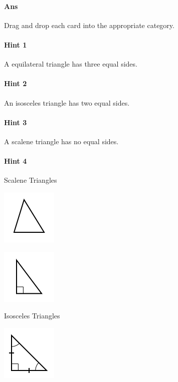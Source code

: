 \documentclass[twocolumn,10pt]{article}
\def\shrinkfactor{0.55}
\begin{document}
\paragraph{Ans} Drag and drop each card into the appropriate category. 

\paragraph{Hint 1}A equilateral triangle has three equal sides.



\paragraph{Hint 2}An isosceles triangle has two equal sides.

\paragraph{Hint 3}A scalene triangle has no equal sides.

\paragraph{Hint 4}Scalene Triangles


\includegraphics[scale=\shrinkfactor]{figures/ee7f87a00acb47dec4f2b2eed9a6741b21afc47d.png}


\includegraphics[scale=\shrinkfactor]{figures/3b6a413f170d28d15c5ddce4ea5150108fc79f24.png}

Isosceles Triangles


\includegraphics[scale=\shrinkfactor]{figures/8837c2c90c5edbd24cdce3fa7e110370dd5dcdef.png}
\end{document}

